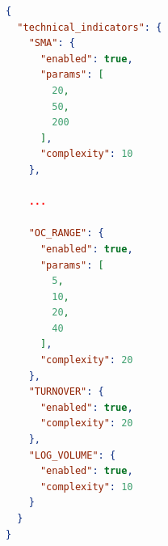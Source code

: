\documentclass[12pt,twoside=false,a4paper,parskip]{scrbook}
\begin{document}
\begin{lstlisting}[language=json, caption={Feature Configuration - shortened for readability - complete file listed in code repository.}, label={code:feature_config_json}]
{
  "technical_indicators": {
    "SMA": {
      "enabled": true,
      "params": [
        20,
        50,
        200
      ],
      "complexity": 10
    },

    ...
    
    "OC_RANGE": {
      "enabled": true,
      "params": [
        5,
        10,
        20,
        40
      ],
      "complexity": 20
    },
    "TURNOVER": {
      "enabled": true,
      "complexity": 20
    },
    "LOG_VOLUME": {
      "enabled": true,
      "complexity": 10
    }
  }
}
\end{lstlisting}
\end{document}
